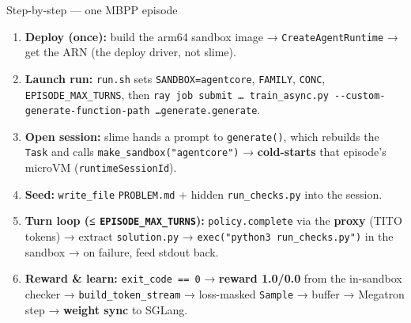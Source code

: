 \documentclass[
  10pt,
  ignorenonframetext,
  aspectratio=169,
  t]{beamer}
\providecommand{\tightlist}{%
  \setlength{\itemsep}{0pt}\setlength{\parskip}{0pt}}
\begin{document}
\begin{frame}{Step-by-step --- one MBPP episode}
\protect\hypertarget{step-by-step-one-mbpp-episode}{}
\begin{enumerate}
\tightlist
\item
  \textbf{Deploy (once):} build the arm64 sandbox image →
  \texttt{CreateAgentRuntime} → get the ARN (the deploy driver, not
  slime).
\item
  \textbf{Launch run:} \texttt{run.sh} sets \texttt{SANDBOX=agentcore},
  \texttt{FAMILY}, \texttt{CONC}, \texttt{EPISODE\_MAX\_TURNS}, then
  \texttt{ray\ job\ submit\ …\ train\_async.py\ -\/-custom-generate-function-path\ …generate.generate}.
\item
  \textbf{Open session:} slime hands a prompt to \texttt{generate()},
  which rebuilds the \texttt{Task} and calls
  \texttt{make\_sandbox("agentcore")} → \textbf{cold-starts} that
  episode's microVM (\texttt{runtimeSessionId}).
\item
  \textbf{Seed:} \texttt{write\_file} \texttt{PROBLEM.md} + hidden
  \texttt{run\_checks.py} into the session.
\item
  \textbf{Turn loop (≤ \texttt{EPISODE\_MAX\_TURNS}):}
  \texttt{policy.complete} via the \textbf{proxy} (TITO tokens) →
  extract \texttt{solution.py} →
  \texttt{exec("python3\ run\_checks.py")} in the sandbox → on failure,
  feed stdout back.
\item
  \textbf{Reward \& learn:} \texttt{exit\_code\ ==\ 0} → \textbf{reward
  1.0/0.0} from the in-sandbox checker → \texttt{build\_token\_stream} →
  loss-masked \texttt{Sample} → buffer → Megatron step → \textbf{weight
  sync} to SGLang.
\end{enumerate}
\end{frame}
\end{document}

